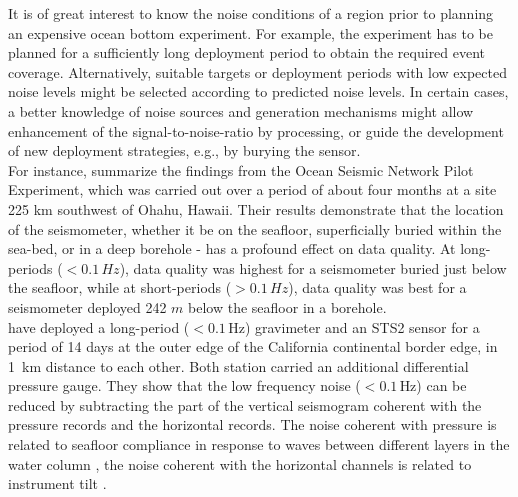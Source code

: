 \documentclass{article}
\begin{document}
{It is of great interest to know the noise 
conditions of a region prior to planning an expensive ocean 
bottom experiment.   
For example, the experiment has to be planned for a sufficiently
long deployment period to obtain the required event
coverage. Alternatively, suitable targets or deployment periods with
low expected noise levels might be selected according to predicted
noise levels. In certain cases, a better knowledge of noise sources and
generation mechanisms might allow enhancement of the
signal-to-noise-ratio by processing, or guide the development of new
deployment strategies, e.g., by burying the sensor.
\\
For instance, 
\cite{collins:01}  summarize the findings from the 
Ocean Seismic Network Pilot Experiment, which was carried out 
over a period of about four months at a site 225 km southwest 
of Ohahu, Hawaii.
Their results demonstrate that the location of the seismometer, whether 
it be on the seafloor, superficially buried within the sea-bed, 
or in a deep borehole - has a profound effect on data quality.
At long-periods ($< 0.1\, Hz$), data quality was highest 
for a seismometer buried just below the seafloor, while at 
short-periods ($>0.1 \, Hz$), data quality was best for a seismometer
deployed 242 $m$ below the seafloor in a borehole.  
\\
\cite{crawford:00} have deployed a long-period ($<0.1\, $Hz)
gravimeter and an STS2 sensor for a period of 14 days 
at the outer edge of the California continental border edge,
in 1~km distance to each other. 
Both station carried an additional differential pressure gauge.
They show that the low frequency noise ($<0.1\, $Hz) 
can be reduced by subtracting the part of the vertical seismogram 
coherent with the pressure records and the horizontal records. The
noise coherent with pressure is related to seafloor
compliance in response to waves between different layers in the water
column \cite[][]{webb:99}, the noise coherent with the horizontal channels 
is related to instrument tilt \cite[e.g.][]{crawford:00}.

}
\end{document}
